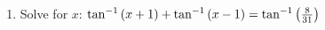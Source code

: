 \begin{enumerate}

\item Solve for $x$:
$\tan^{-1}\left(x+1\right) + \tan^{-1}\left(x-1\right) = \tan^{-1}\left(\frac{8}{31}\right)$        
\end{enumerate}
